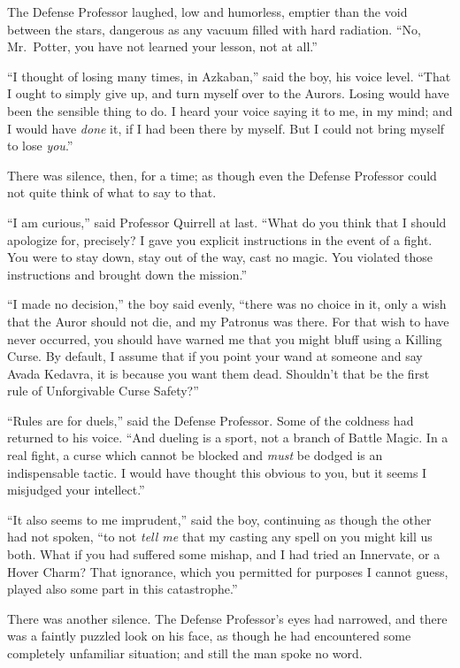 The Defense Professor laughed, low and humorless, emptier than the void between the stars, dangerous as any vacuum filled with hard radiation. “No, Mr.~Potter, you have not learned your lesson, not at all.”

“I thought of losing many times, in Azkaban,” said the boy, his voice level. “That I ought to simply give up, and turn myself over to the Aurors. Losing would have been the sensible thing to do. I heard your voice saying it to me, in my mind; and I would have \emph{done} it, if I had been there by myself. But I could not bring myself to lose \emph{you}.”

There was silence, then, for a time; as though even the Defense Professor could not quite think of what to say to that.

“I am curious,” said Professor Quirrell at last. “What do you think that I should apologize for, precisely? I gave you explicit instructions in the event of a fight. You were to stay down, stay out of the way, cast no magic. You violated those instructions and brought down the mission.”

“I made no decision,” the boy said evenly, “there was no choice in it, only a wish that the Auror should not die, and my Patronus was there. For that wish to have never occurred, you should have warned me that you might bluff using a Killing Curse. By default, I assume that if you point your wand at someone and say Avada Kedavra, it is because you want them dead. Shouldn’t that be the first rule of Unforgivable Curse Safety?”

“Rules are for duels,” said the Defense Professor. Some of the coldness had returned to his voice. “And dueling is a sport, not a branch of Battle Magic. In a real fight, a curse which cannot be blocked and \emph{must} be dodged is an indispensable tactic. I would have thought this obvious to you, but it seems I misjudged your intellect.”

“It also seems to me imprudent,” said the boy, continuing as though the other had not spoken, “to not \emph{tell me} that my casting any spell on you might kill us both. What if you had suffered some mishap, and I had tried an Innervate, or a Hover Charm? That ignorance, which you permitted for purposes I cannot guess, played also some part in this catastrophe.”

There was another silence. The Defense Professor’s eyes had narrowed, and there was a faintly puzzled look on his face, as though he had encountered some completely unfamiliar situation; and still the man spoke no word.

